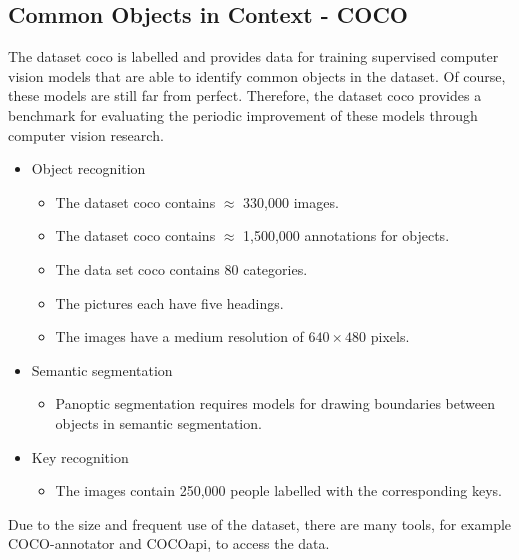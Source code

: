 %
%


\subsection{Common Objects in Context - COCO}


The dataset \ac{coco} is labelled and provides data for training supervised computer vision models that are able to identify common objects in the dataset. Of course, these models are still far from perfect. Therefore, the dataset \ac{coco} provides a benchmark for evaluating the periodic improvement of these models through computer vision research.\cite{Lin:2014,Coco:2021}

\bigskip

\begin{itemize}
    \item Object recognition
     \begin{itemize}
       \item The dataset \ac{coco} contains $\approx$ 330,000 images.
       \item The dataset \ac{coco} contains $\approx$ 1,500,000 annotations for objects.
       \item The data set \ac{coco} contains 80 categories.
       \item The pictures each have five headings.
       \item The images have a medium resolution of $640 \times 480$ pixels.
     \end{itemize}  
  \item Semantic segmentation
    \begin{itemize}
        \item Panoptic segmentation requires models for drawing boundaries between objects in semantic segmentation.
    \end{itemize}

  \item Key recognition
    \begin{itemize}
      \item The images contain 250,000 people labelled with the corresponding keys.
    \end{itemize}
\end{itemize}




Due to the size and frequent use of the dataset, there are many tools, for example COCO-annotator and COCOapi, to access the data.



